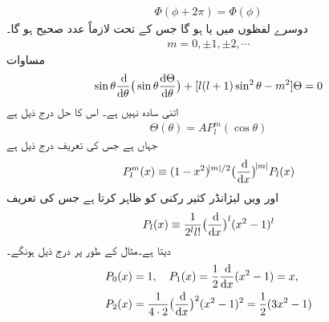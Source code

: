 \begin{align}
\Phi(\phi+2\pi)=\Phi(\phi) 
\end{align}
دوسرے لفظوں میں   یا  ہو گا جس کے تحت  لازماً عدد صحیح ہو گا۔
\begin{align}
m=0,\pm 1,\pm 2,\cdots
\end{align}
 مساوات  
\begin{align}\label{مساوات_ابعادی_تھیٹا_مساوات}
\sin{\theta}\frac{\dif}{\dif{\theta}}\big(\sin{\theta}\frac{\dif{\Theta}}{\dif{\theta}}\big)+[l(l+1)\sin^{2}{\theta}-m^{2}]\Theta=0 
\end{align}
اتنی سادہ نہیں ہے۔ اس کا حل درج ذیل ہے
\begin{align}
\Theta(\theta)=AP_{l}^{m}(\cos{\theta}) 
\end{align}
جہاں      ہے جس کی تعریف درج ذیل ہے
\begin{align}\label{مساوات_ابعادی_شریک_لیژانڈر_تفاعلات_تعریف}
P_{l}^{m}(x)\equiv (1-x^{2})^{\abs{m}/2}\big(\frac{\dif}{\dif{x}}\big)^{\abs{m}}P_{l}(x) 
\end{align}
اور  ویں لیژانڈر کثیر رکنی  کو     ظاہر کرتا ہے جس کی تعریف 
\begin{align}\label{مساوات_ابعادی_روڈریگیس}
P_{l}(x)\equiv\frac{1}{2^{l}l!}\big(\frac{\dif}{\dif{x}}\big)^{l}(x^{2}-1)^{l} 
\end{align}
دیتا ہے۔مثال کے طور پر درج ذیل ہونگے۔
\begin{align*}
P_{0}(x)&=1,\quad P_{1}(x)=\frac{1}{2}\frac{\dif}{\dif{x}}(x^{2}-1)=x ,\\
P_{2}(x)&=\frac{1}{4\cdot 2}\big(\frac{\dif}{\dif{x}}\big)^{2}(x^{2}-1)^{2}=\frac{1}{2}(3x^{2}-1) 
\end{align*}
%

